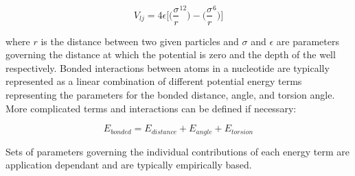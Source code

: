 \documentclass[journal]{IEEEtran}
\begin{document}
\begin{equation}
\label{eq:lennard-jones}
	V_{lj} = 4\epsilon \bigg[ \bigg( \frac{\sigma}{r}^{12} \bigg) - \bigg( \frac{\sigma}{r}^6 \bigg) \bigg]
\end{equation}

where $r$ is the distance between two given particles and $\sigma$ and $\epsilon$ are parameters governing the distance at which the potential is zero and the depth of the well respectively. Bonded interactions between atoms in a nucleotide are typically represented as a linear combination of different potential energy terms representing the parameters for the bonded distance, angle, and torsion angle. More complicated terms and interactions can be defined if necessary:

\begin{equation}
\label{eq:bonded-interactions}
	E_{bonded} = E_{distance} + E_{angle} + E_{torsion}
\end{equation}

Sets of parameters governing the individual contributions of each energy term are application dependant and are typically empirically based. 
\end{document}
